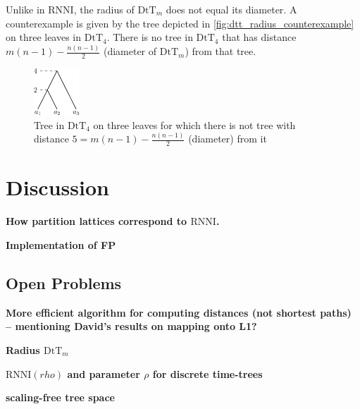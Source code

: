 \documentclass[11pt]{amsart}
\newcommand{\rnni}{\mathrm{RNNI}}
\newcommand{\dtt}{\mathrm{DtT}}
\newcommand{\summary}[1]{\textbf{#1}} %
\begin{document}
Unlike in $\rnni$, the radius of $\dtt_m$ does not equal its diameter.
A counterexample is given by the tree depicted in \autoref{fig:dtt_radius_counterexample} on three leaves in $\dtt_4$.
There is no tree in $\dtt_4$ that has distance $m(n-1) - \frac{n(n-1)}{2}$ (diameter of $\dtt_m$) from that tree.

\begin{figure}[ht]
	\includegraphics[width=0.15\textwidth]{dtt_radius_counterexample.eps}
	\caption{Tree in $\dtt_4$ on three leaves for which there is not tree with distance $5 = m(n-1) - \frac{n(n-1)}{2}$ (diameter) from it}
	\label{fig:dtt_radius_counterexample}
\end{figure}


\section{Discussion}

\summary{How partition lattices correspond to $\rnni$.}

\summary{Implementation of FP}

\subsection{Open Problems}

\summary{More efficient algorithm for computing distances (not shortest paths) -- mentioning David's results on mapping onto L1?}

\summary{Radius $\dtt_m$}

\summary{$\rnni(rho)$ and parameter $\rho$ for discrete time-trees}

\summary{scaling-free tree space}
\end{document}
